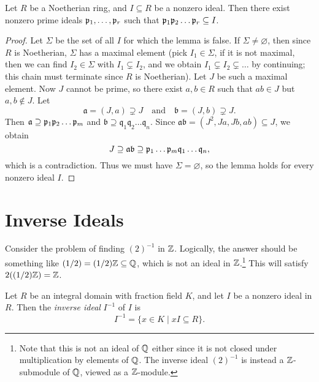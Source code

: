 \begin{lemma}
  Let $R$ be a Noetherian ring, and $I \subseteq R$
  be a nonzero ideal. Then there exist
  nonzero prime ideals $\mathfrak{p}_1, \dots, \mathfrak{p}_r$ such that
  $\mathfrak{p}_1 \mathfrak{p}_2 \dots \mathfrak{p}_r \subseteq I$.
\end{lemma}

\begin{proof}
  Let $\Sigma$ be the set of all $I$ for which
  the lemma is false. If $\Sigma \ne \varnothing$, then
  since $R$ is Noetherian, $\Sigma$ has a maximal
  element (pick $I_1 \in \Sigma$, if it is not maximal,
  then we can find $I_2 \in \Sigma$ with
  $I_1 \subsetneq I_2$, and we obtain
  $I_1 \subsetneq I_2 \subsetneq \dots$ by continuing;
  this chain must terminate since $R$ is Noetherian).
  Let $J$ be such a maximal element. Now $J$ cannot
  be prime, so there exist $a, b \in R$ such that
  $ab \in J$ but $a, b \notin J$. Let
  \[
    \mathfrak{a} = (J, a) \supsetneq J \quad
    \text{and} \quad \mathfrak{b} = (J, b) \supsetneq J.
  \]
  Then $\mathfrak{a} \supseteq \mathfrak{p}_1 \mathfrak{p}_2 \dots \mathfrak{p}_m$
  and $\mathfrak{b} \supseteq \mathfrak{q}_1 \mathfrak{q}_2 \dots \mathfrak{q}_n$.
  Since $\mathfrak{a} \mathfrak{b} = (J^2, Ja, Jb, ab) \subseteq J$, we obtain
  \[
    J \supseteq \mathfrak{a} \mathfrak{b} \supseteq \mathfrak{p}_1 \dots \mathfrak{p}_m \mathfrak{q}_1 \dots \mathfrak{q}_n,
  \]
  which is a contradiction. Thus we must have
  $\Sigma = \varnothing$, so the lemma holds for
  every nonzero ideal $I$.
\end{proof}

\section{Inverse Ideals}

\begin{example}
  Consider the problem of finding $(2)^{-1}$ in $\mathbb{Z}$.
  Logically, the answer should be something like $(1 / 2) = (1 / 2) \mathbb{Z} \subseteq \mathbb{Q}$,
  which is not an ideal in $\mathbb{Z}$.\footnote{Note that this is not an ideal of $\mathbb{Q}$ either since it is not closed under multiplication by elements of $\mathbb{Q}$. The inverse ideal $(2)^{-1}$ is instead a $\mathbb{Z}$-submodule of $\mathbb{Q}$, viewed as a $\mathbb{Z}$-module.}
  This will satisfy $2 ((1 / 2)\mathbb{Z}) = \mathbb{Z}$.
\end{example}

\begin{definition}
  Let $R$ be an integral domain with fraction field $K$,
  and let $I$ be a nonzero ideal in $R$. Then
  the \emph{inverse ideal} $I^{-1}$ of $I$ is
  \[
    I^{-1} = \{x \in K \mid xI \subseteq R\}.
  \]
\end{definition}

